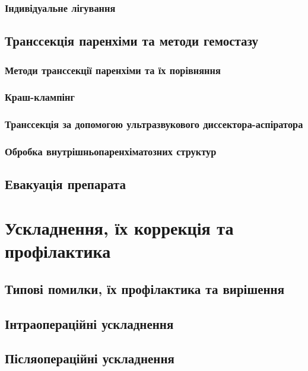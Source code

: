 \begin{refsection}
\subsubsection{Індивідуальне лігування}

\subsection{Транссекція паренхіми та методи гемостазу}

\subsubsection{Методи транссекції паренхіми та їх порівняння}

\subsubsection{Краш-клампінг}

\subsubsection{Транссекція за допомогою ультразвукового диссектора-аспіратора}

\subsubsection{Обробка внутрішньопаренхіматозних структур}

\subsection{Евакуація препарата}

\section{Ускладнення, їх коррекція та профілактика}

\subsection{Типові помилки, їх профілактика та вирішення}

\subsection{Інтраопераційні ускладнення}

\subsection{Післяопераційні ускладнення}

\printbibliography [heading=subbibliography]
\end{refsection}